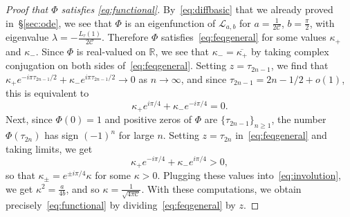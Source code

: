 \documentclass[12pt]{amsart}
\theoremstyle{plain}
\numberwithin{equation}{section}
\theoremstyle{definition}
\newcommand{\R}{\mathbb{R}}
\newcommand{\Cone}{\mathscr{C}}
\begin{document}
\begin{proof}[Proof that $\Phi$ satisfies \eqref{eq:functional}] By~\eqref{eq:diffbasic} that we already proved in~\S\ref{sec:ode}, we see that $\Phi$ is an eigenfunction of $\mathcal{L}_{a,b}$ for $a=\frac{1}{2\Cone}$, $b=\frac{\pi}{2}$, with eigenvalue $\lambda=-\frac{L_{\tau}(1)}{2\Cone}$. Therefore $\Phi$ satisfies~\eqref{eq:feqgeneral} for some values $\kappa_{+}$ and $\kappa_{-}$. Since $\Phi$ is real-valued on $\R$, we see that $\kappa_{-}=\overline{\kappa_{+}}$ by taking complex conjugation on both sides of~\eqref{eq:feqgeneral}. Setting $z=\tau_{2n-1}$, we find that
	$\kappa_{+}e^{-i\pi\tau_{2n-1}/2}+\kappa_{-}e^{i\pi\tau_{2n-1}/2}\to 0$ as $n\to\infty$,
	and since $\tau_{2n-1}=2n-1/2+o(1)$, this is equivalent to
	\[\kappa_{+}e^{i\pi/4}+\kappa_{-}e^{-i\pi/4} = 0.\]
	Next, since $\Phi(0)=1$ and positive zeros of $\Phi$ are $\{\tau_{2n-1}\}_{n\ge1}$, the number $\Phi(\tau_{2n})$ has sign $(-1)^n$ for large $n$. Setting $z=\tau_{2n}$ in~\eqref{eq:feqgeneral} and taking limits, we get
	\[\kappa_{+}e^{-i\pi/4}+\kappa_{-}e^{i\pi/4} > 0,\]
	so that $\kappa_{\pm}=e^{\pm i\pi/4}\kappa$ for some $\kappa>0$.  Plugging these values into~\eqref{eq:involution}, we get $\kappa^2=\frac{a}{4b}$, and so $\kappa=\frac{1}{\sqrt{4\pi \Cone}}$. With these computations, we obtain precisely~\eqref{eq:functional} by dividing~\eqref{eq:feqgeneral} by $z$. \end{proof}
\end{document}

